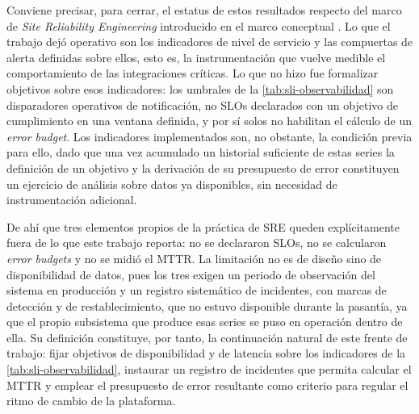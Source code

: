 Conviene precisar, para cerrar, el estatus de estos resultados respecto del marco de \textit{Site Reliability Engineering} introducido en el marco conceptual \cite{Beyer2016}. Lo que el trabajo dejó operativo son los indicadores de nivel de servicio y las compuertas de alerta definidas sobre ellos, esto es, la instrumentación que vuelve medible el comportamiento de las integraciones críticas. Lo que no hizo fue formalizar objetivos sobre esos indicadores: los umbrales de la \autoref{tab:sli-observabilidad} son disparadores operativos de notificación, no SLOs declarados con un objetivo de cumplimiento en una ventana definida, y por sí solos no habilitan el cálculo de un \textit{error budget}. Los indicadores implementados son, no obstante, la condición previa para ello, dado que una vez acumulado un historial suficiente de estas series la definición de un objetivo y la derivación de su presupuesto de error constituyen un ejercicio de análisis sobre datos ya disponibles, sin necesidad de instrumentación adicional.

De ahí que tres elementos propios de la práctica de SRE queden explícitamente fuera de lo que este trabajo reporta: no se declararon SLOs, no se calcularon \textit{error budgets} y no se midió el MTTR. La limitación no es de diseño sino de disponibilidad de datos, pues los tres exigen un periodo de observación del sistema en producción y un registro sistemático de incidentes, con marcas de detección y de restablecimiento, que no estuvo disponible durante la pasantía, ya que el propio subsistema que produce esas series se puso en operación dentro de ella. Su definición constituye, por tanto, la continuación natural de este frente de trabajo: fijar objetivos de disponibilidad y de latencia sobre los indicadores de la \autoref{tab:sli-observabilidad}, instaurar un registro de incidentes que permita calcular el MTTR y emplear el presupuesto de error resultante como criterio para regular el ritmo de cambio de la plataforma.
